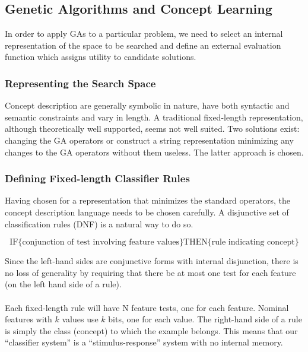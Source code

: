 \documentclass[../main.tex]{subfiles}
\begin{document}
\subsection{Genetic Algorithms and Concept Learning}
In order to apply GAs to a particular problem, we need to select an internal representation of the space to be searched
and define an external evaluation function which assigns utility to candidate solutions.

\subsubsection{Representing the Search Space}

Concept description are generally symbolic in nature, have both syntactic and semantic constraints and vary in length.
A traditional fixed-length representation, although theoretically well supported, seems not well suited. Two solutions
exist: changing the GA operators or construct a string representation minimizing any changes to the GA operators
without them useless. The latter approach is chosen.

\subsubsection{Defining Fixed-length Classifier Rules}

Having chosen for a representation that minimizes the standard operators, the concept description language needs to be
chosen carefully. A disjunctive set of classification rules (DNF) is a natural way to do so.

\[
\text{IF} \{ \text{conjunction of test involving feature values} \} \text{THEN} \{ \text{rule indicating concept} \}
\]

Since the left-hand sides are conjunctive forms with internal disjunction, there is no loss of generality by requiring
that there be at most one test for each feature (on the left hand side of a rule).
\\\\
Each fixed-length rule will have N feature tests, one for each feature. Nominal features with $k$ values use $k$ bits,
one for each value. The right-hand side of a rule is simply the class (concept) to which the example belongs. This
means that our ``classifier system'' is a ``stimulus-response'' system with no internal memory.
\end{document}
